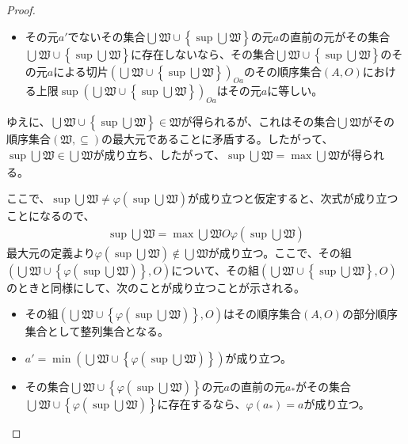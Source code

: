 \documentclass[dvipdfmx]{jsarticle}
\begin{document}
\begin{proof}
\begin{itemize}
\item
  その元$a'$でないその集合$\bigcup_{} \mathfrak{W} \cup \left\{ \sup{\bigcup_{} \mathfrak{W}} \right\}$の元$a$の直前の元がその集合$\bigcup_{} \mathfrak{W} \cup \left\{ \sup{\bigcup_{} \mathfrak{W}} \right\}$に存在しないなら、その集合$\bigcup_{} \mathfrak{W} \cup \left\{ \sup{\bigcup_{} \mathfrak{W}} \right\}$のその元$a$による切片$\left( \bigcup_{} \mathfrak{W} \cup \left\{ \sup{\bigcup_{} \mathfrak{W}} \right\} \right)_{Oa}$のその順序集合$(A,O)$における上限$\sup\left( \bigcup_{} \mathfrak{W} \cup \left\{ \sup{\bigcup_{} \mathfrak{W}} \right\} \right)_{Oa}$はその元$a$に等しい。
\end{itemize}
ゆえに、$\bigcup_{} \mathfrak{W} \cup \left\{ \sup{\bigcup_{} \mathfrak{W}} \right\}\in \mathfrak{W}$が得られるが、これはその集合$\bigcup_{} \mathfrak{W}$がその順序集合$\left( \mathfrak{W, \subseteq} \right)$の最大元であることに矛盾する。したがって、$\sup{\bigcup_{} \mathfrak{W}} \in \bigcup_{} \mathfrak{W}$が成り立ち、したがって、$\sup{\bigcup_{} \mathfrak{W}} = \max{\bigcup_{} \mathfrak{W}}$が得られる。\par
ここで、$\sup{\bigcup_{} \mathfrak{W}} \neq \varphi\left( \sup{\bigcup_{} \mathfrak{W}} \right)$が成り立つと仮定すると、次式が成り立つことになるので、
\begin{align*}
\sup{\bigcup_{} \mathfrak{W}} = \max{\bigcup_{} \mathfrak{W}}O\varphi\left( \sup{\bigcup_{} \mathfrak{W}} \right)
\end{align*}
最大元の定義より$\varphi\left( \sup{\bigcup_{} \mathfrak{W}} \right) \notin \bigcup_{} \mathfrak{W}$が成り立つ。ここで、その組$\left( \bigcup_{} \mathfrak{W} \cup \left\{ \varphi\left( \sup{\bigcup_{} \mathfrak{W}} \right) \right\},O \right)$について、その組$\left( \bigcup_{} \mathfrak{W} \cup \left\{ \sup{\bigcup_{} \mathfrak{W}} \right\},O \right)$のときと同様にして、次のことが成り立つことが示される。
\begin{itemize}
\item
  その組$\left( \bigcup_{} \mathfrak{W} \cup \left\{ \varphi\left( \sup{\bigcup_{} \mathfrak{W}} \right) \right\},O \right)$はその順序集合$(A,O)$の部分順序集合として整列集合となる。
\item
  $a' = \min\left( \bigcup_{} \mathfrak{W} \cup \left\{ \varphi\left( \sup{\bigcup_{} \mathfrak{W}} \right) \right\} \right)$が成り立つ。
\item
  その集合$\bigcup_{} \mathfrak{W} \cup \left\{ \varphi\left( \sup{\bigcup_{} \mathfrak{W}} \right) \right\}$の元$a$の直前の元$a_{*}$がその集合$\bigcup_{} \mathfrak{W} \cup \left\{ \varphi\left( \sup{\bigcup_{} \mathfrak{W}} \right) \right\}$に存在するなら、$\varphi\left( a_{*} \right) = a$が成り立つ。

\end{itemize}
\end{proof}
\end{document}
